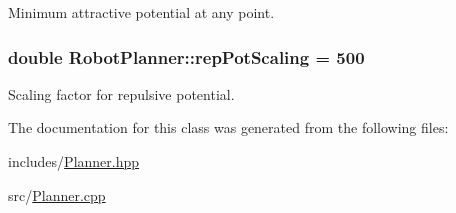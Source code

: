Minimum attractive potential at any point. \hypertarget{classRobotPlanner_a0b056d74826bddeb6dbd5a458aad0758}{
\subsubsection[{rep\-Pot\-Scaling}]{\setlength{\rightskip}{0pt plus 5cm}double Robot\-Planner\-::rep\-Pot\-Scaling = 500}}\label{classRobotPlanner_a0b056d74826bddeb6dbd5a458aad0758}
Scaling factor for repulsive potential. 

The documentation for this class was generated from the following files\-:\begin{DoxyCompactItemize}
\item 
includes/\hyperlink{Planner_8hpp}{Planner.\-hpp}\item 
src/\hyperlink{Planner_8cpp}{Planner.\-cpp}\end{DoxyCompactItemize}
